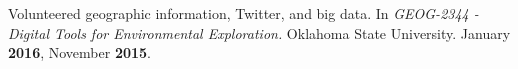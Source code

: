 \begin{cventries}
  \cventry
    {}
    {}
    {}
    {}
    {
      \begin{cvitems}
        \vspace{-3mm}
      \item Volunteered geographic information, Twitter, and big data. In
        {\textit{GEOG-2344 - Digital Tools for Environmental Exploration.}
          Oklahoma State University. January \textbf{2016}, November
          \textbf{2015}}.
        \end{cvitems}
    }

\end{cventries}